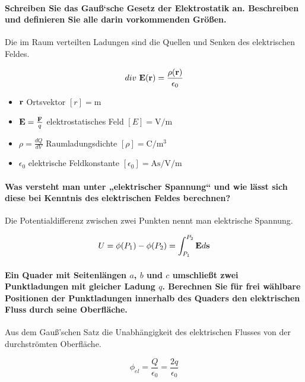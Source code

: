 \documentclass[a4paper, 11pt, parskip=half]{scrartcl}
\begin{document}
\paragraph{Schreiben Sie das Gauß‘sche Gesetz der Elektrostatik an. Beschreiben und definieren Sie
alle darin vorkommenden Größen.} Die im Raum verteilten Ladungen sind die Quellen und Senken des
elektrischen Feldes.

\begin{equation}
    div~\bold{E(r)} = \frac{\rho(\bold{r})}{\epsilon_0}
\end{equation}

\begin{itemize}
    \item $\bold{r}$ Ortsvektor $[r] = \si{\m}$
    \item $\bold{E} = \frac{\bold{F}}{q}$ elektrostatisches Feld $[E] = \si{\V\per\m}$
    \item $\rho = \frac{dQ}{dV}$ Raumladungsdichte $[\rho] = \si{\coulomb\per\m^3}$
    \item $\epsilon_0$ elektrische Feldkonstante $[\epsilon_0] = \si{\A\s\per\V\per\m}$
\end{itemize}

\paragraph{Was versteht man unter „elektrischer Spannung“ und wie lässt sich diese bei Kenntnis des
elektrischen Feldes berechnen?} Die Potentialdifferenz zwischen zwei Punkten nennt man elektrische
Spannung.

\begin{equation}
    U = \phi(P_1) - \phi(P_2) = \int_{P_1}^{P_2} \bold{E} d\bold{s}
\end{equation}

\paragraph{Ein Quader mit Seitenlängen $a$, $b$ und $c$ umschließt zwei Punktladungen mit gleicher
Ladung $q$. Berechnen Sie für frei wählbare Positionen der Punktladungen innerhalb des Quaders den
elektrischen Fluss durch seine Oberfläche.} Aus dem Gauß'schen Satz die Unabhängigkeit des
elektrischen Flusses von der durchströmten Oberfläche.

\begin{equation}
    \phi_{el} = \frac{Q}{\epsilon_0} = \frac{2 q}{\epsilon_0}
\end{equation}
\end{document}

